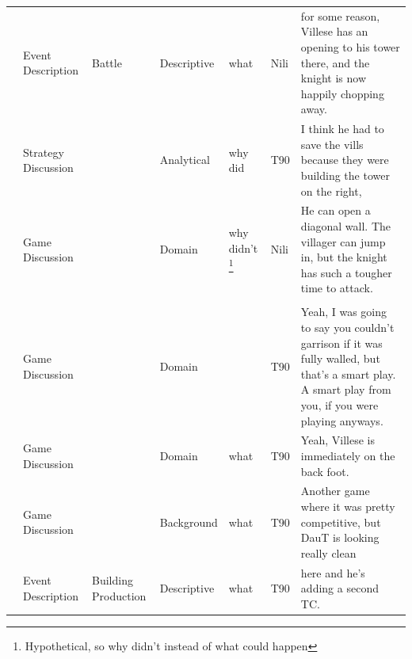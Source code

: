{\begin{longtable}{@{}>{\theAppRow}r|L{2.3cm}L{2.2cm}L{1.4cm}L{2.2cm}L{0.5cm}U{5.6cm}@{}}
    & Event Description     & Battle               & Descriptive   & what              & Nili    & for some reason, Villese has an opening to his tower there, and the knight is now happily chopping away.                                                                                                                 \\
    & Strategy Discussion   &                      & Analytical  & why did           & T90     & I think he had to save the vills because they were building the tower on the right,                                                                                                                                      \\
    & Game Discussion       &                      & Domain      & why didn't \footnote{\label{foot:hypothetical}Hypothetical, so why didn't instead of what could happen}   & Nili    & He can open a diagonal wall. The villager can jump in, but the knight has such a tougher time to attack.                                                                                         \\                       \\
    & Game Discussion       &                      & Domain      &                   & T90     & Yeah, I was going to say you couldn't garrison if it was fully walled, but that's a smart play. A smart play from you, if you were playing anyways.                                                                      \\
    & Game Discussion       &                      & Domain      & what              & T90     & Yeah, Villese is immediately on the back foot.                                                                                                                                                                           \\
    & Game Discussion       &                      & Background  & what              & T90     & Another game where it was pretty competitive, but DauT is looking really clean                                                                                                                                           \\
    & Event Description     & Building Production  & Descriptive   & what              & T90     & here and he's adding a second TC.                                                                                                                                                                                        \\

\end{longtable}}
